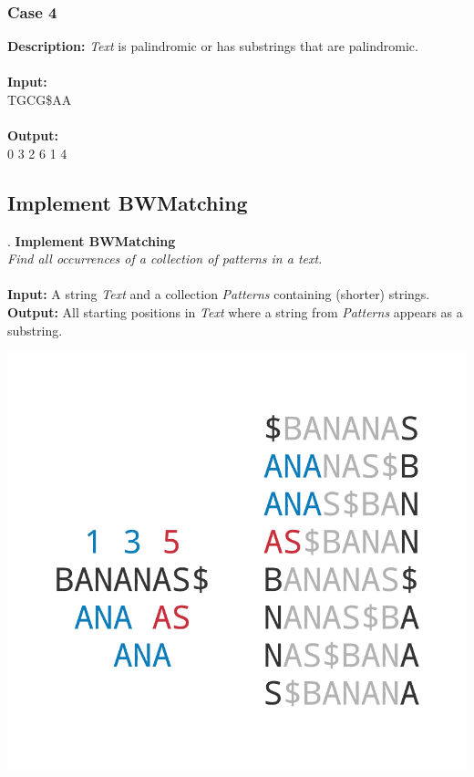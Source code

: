 \documentclass{article}
\newcommand{\code}[1]{{\fontfamily{pcr}\selectfont #1}}
\begin{document}
\subsubsection*{Case 4}
\hline \vspace{5}
\textbf{Description:} \emph{Text} is palindromic or has substrings that are palindromic.\\ \\
\noindent \textbf{Input:}\\
\code{TGCG\$AA}\\ \\
\noindent \textbf{Output:}\\
\code{5 0 3 2 6 1 4}
\pagebreak
\subsection{Implement BWMatching}.
\hline\vspace{5}
\noindent\textbf{Implement BWMatching}\\
\emph{Find all occurrences of a collection of patterns in a text.}\\ \\
\textbf{Input:} A string \emph{Text} and a collection \emph{Patterns} containing (shorter) strings. \\
\textbf{Output:} All starting positions in \emph{Text} where a string from \emph{Patterns} appears as a substring.
\begin{center}
    \includegraphics[scale=0.2]{c9/logos/9LMN.png} 
\end{center}
\hline\vspace{5}
\end{document}
